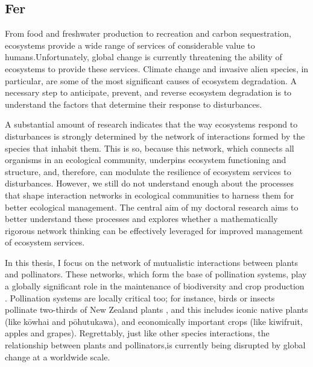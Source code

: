 
\begin{refsection}
\chapter{Fer} %
\label{fer}
From food and freshwater production to recreation and carbon sequestration, ecosystems provide a wide range of services of considerable value to humans.Unfortunately, global change is currently threatening the ability of ecosystems to provide these services. Climate change and invasive alien species, in particular, are some of the most significant causes of ecosystem degradation.
A necessary step to anticipate, prevent, and reverse ecosystem degradation is to understand the factors that determine their response to disturbances.

A substantial amount of research indicates that the way ecosystems respond to disturbances is strongly determined by the network of interactions formed by the species that inhabit them.
This is so, because this network, which connects all organisms in an ecological community, underpins ecosystem functioning and structure, and, therefore, can modulate the resilience of ecosystem services to disturbances. However, we still do not understand enough about the processes that shape interaction networks in ecological communities to harness them for better ecological management.
The central aim of my doctoral research aims to better understand these processes and explores whether a mathematically rigorous network thinking can be effectively leveraged for improved management of ecosystem services.

In this thesis, I focus on the network of mutualistic interactions between plants and pollinators.
These networks, which form the base of pollination systems, play a globally significant role in the maintenance of biodiversity and crop production .
Pollination systems are locally critical too; for instance, birds or insects pollinate two-thirds of New Zealand plants , and this includes iconic native plants (like kōwhai and pōhutukawa), and economically important crops (like kiwifruit, apples and grapes).
Regrettably, just like other species interactions, the relationship between plants and pollinators,is currently being disrupted by global change at a worldwide scale.


\end{refsection}
